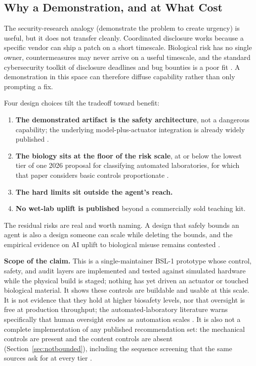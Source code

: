 \documentclass[11pt,letterpaper]{article}
\begin{document}
\subsection{Why a Demonstration, and at What Cost}

The security-research analogy (demonstrate the problem to create urgency) is useful, but it does not transfer cleanly. Coordinated disclosure works because a specific vendor can ship a patch on a short timescale. Biological risk has no single owner, countermeasures may never arrive on a useful timescale, and the standard cybersecurity toolkit of disclosure deadlines and bug bounties is a poor fit \cite{millett2024}. A demonstration in this space can therefore diffuse capability rather than only prompting a fix.

Four design choices tilt the tradeoff toward benefit:

\begin{enumerate}
  \item \textbf{The demonstrated artifact is the safety architecture}, not a dangerous capability; the underlying model-plus-actuator integration is already widely published \cite{tobias2025,luhachack2026}.
  \item \textbf{The biology sits at the floor of the risk scale}, at or below the lowest tier of one 2026 proposal for classifying automated laboratories, for which that paper considers basic controls proportionate \cite{smith2026}.
  \item \textbf{The hard limits sit outside the agent's reach.}
  \item \textbf{No wet-lab uplift is published} beyond a commercially sold teaching kit.
\end{enumerate}

The residual risks are real and worth naming. A design that safely bounds an agent is also a design someone can scale while deleting the bounds, and the empirical evidence on AI uplift to biological misuse remains contested \cite{mouton2024,rose2024}.

\textbf{Scope of the claim.} This is a single-maintainer BSL-1 prototype whose control, safety, and audit layers are implemented and tested against simulated hardware while the physical build is staged; nothing has yet driven an actuator or touched biological material. It shows these controls are buildable and usable at this scale. It is not evidence that they hold at higher biosafety levels, nor that oversight is free at production throughput; the automated-laboratory literature warns specifically that human oversight erodes as automation scales \cite{smith2026}. It is also not a complete implementation of any published recommendation set: the mechanical controls are present and the content controls are absent (Section~\ref{sec:notbounded}), including the sequence screening that the same sources ask for at every tier \cite{raixbiodesign2024,smith2026}.
\end{document}
